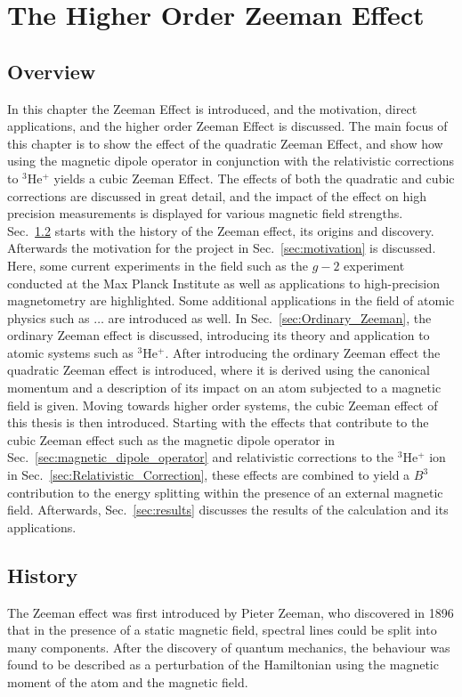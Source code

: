 \chapter{The Higher Order Zeeman Effect}\label{sec:Zeeman-Effect}
    \section{Overview}
        In this chapter the Zeeman Effect is introduced, and the motivation, direct applications, and the higher order Zeeman Effect is discussed. The main focus of this chapter is to show the effect of the quadratic Zeeman Effect, and show how using the magnetic dipole operator in conjunction with the relativistic corrections to $^3$He$^+$ yields a cubic Zeeman Effect. The effects of both the quadratic and cubic corrections are discussed in great detail, and the impact of the effect on high precision measurements is displayed for various magnetic field strengths.\\

       Sec.~\ref{sec:history} starts with the history of the Zeeman effect, its origins and discovery. Afterwards the motivation for the project in Sec.~\ref{sec:motivation} is discussed. Here, some current experiments in the field such as the $g-2$ experiment conducted at the Max Planck Institute as well as applications to high-precision magnetometry are highlighted. Some additional applications in the field of atomic physics such as $\dots$ are introduced as well. In Sec.~\ref{sec:Ordinary_Zeeman}, the ordinary Zeeman effect is discussed, introducing its theory and application to atomic systems such as $^3$He$^+$. After introducing the ordinary Zeeman effect the quadratic Zeeman effect is introduced, where it is derived using the canonical momentum and a description of its impact on an atom subjected to a magnetic field is given. Moving towards higher order systems, the cubic Zeeman effect of this thesis is then introduced. Starting with the effects that contribute to the cubic Zeeman effect such as the magnetic dipole operator in Sec.~\ref{sec:magnetic_dipole_operator} and relativistic corrections to the $^3$He$^+$ ion in Sec.~\ref{sec:Relativistic_Correction}, these effects are combined to yield a $B^3$ contribution to the energy splitting within the presence of an external magnetic field. Afterwards, Sec.~\ref{sec:results} discusses the results of the calculation and its applications.

    \section{History}\label{sec:history}
        The Zeeman effect was first introduced by Pieter Zeeman, who discovered in 1896 that in the presence of a static magnetic field, spectral lines could be split into many components. After the discovery of quantum mechanics, the behaviour was found to be described as a perturbation of the Hamiltonian using the magnetic moment of the atom and the magnetic field.     
    
